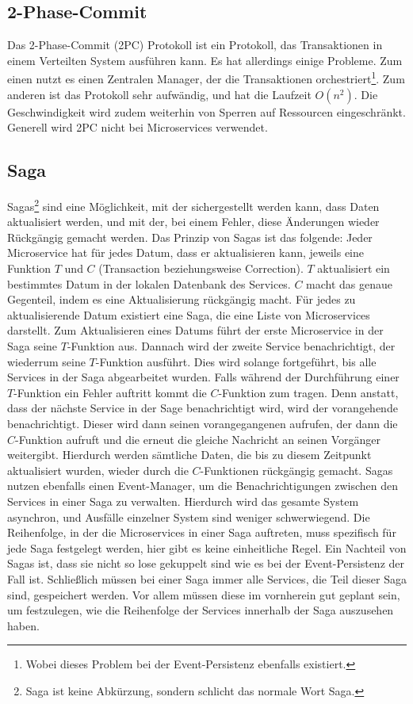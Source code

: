 \subsection{2-Phase-Commit}
Das 2-Phase-Commit (2PC) Protokoll ist ein Protokoll, das Transaktionen in einem Verteilten System ausführen kann. Es hat allerdings einige Probleme. Zum einen nutzt es einen Zentralen Manager, der die Transaktionen orchestriert\footnote{Wobei dieses Problem bei der Event-Persistenz ebenfalls existiert.}. Zum anderen ist das Protokoll sehr aufwändig, und hat die Laufzeit $O(n^2)$. Die Geschwindigkeit wird zudem weiterhin von Sperren auf Ressourcen eingeschränkt. Generell wird 2PC nicht bei Microservices verwendet.

\subsection{Saga}
Sagas\footnote{Saga ist keine Abkürzung, sondern schlicht das normale Wort \glqq Saga\grqq.} sind eine Möglichkeit, mit der sichergestellt werden kann, dass Daten aktualisiert werden, und mit der, bei einem Fehler, diese Änderungen wieder Rückgängig gemacht werden.
Das Prinzip von Sagas ist das folgende:
Jeder Microservice hat für jedes Datum, dass er aktualisieren kann, jeweils eine Funktion $T$ und $C$ (Transaction beziehungsweise Correction). $T$ aktualisiert ein bestimmtes Datum in der lokalen Datenbank des Services. $C$ macht das genaue Gegenteil, indem es eine Aktualisierung rückgängig macht. Für jedes zu aktualisierende Datum existiert eine Saga, die eine Liste von Microservices darstellt. Zum Aktualisieren eines Datums führt der erste Microservice in der Saga seine $T$-Funktion aus. Dannach wird der zweite Service benachrichtigt, der wiederrum seine $T$-Funktion ausführt. Dies wird solange fortgeführt, bis alle Services in der Saga abgearbeitet wurden. Falls während der Durchführung einer $T$-Funktion ein Fehler auftritt kommt die $C$-Funktion zum tragen. Denn anstatt, dass der nächste Service in der Sage benachrichtigt wird, wird der vorangehende benachrichtigt. Dieser wird dann seinen vorangegangenen aufrufen, der dann die $C$-Funktion aufruft und die erneut die gleiche Nachricht an seinen Vorgänger weitergibt. Hierdurch werden sämtliche Daten, die bis zu diesem Zeitpunkt aktualisiert wurden, wieder durch die $C$-Funktionen rückgängig gemacht.
Sagas nutzen ebenfalls einen Event-Manager, um die Benachrichtigungen zwischen den Services in einer Saga zu verwalten. Hierdurch wird das gesamte System asynchron, und Ausfälle einzelner System sind weniger schwerwiegend.
Die Reihenfolge, in der die Microservices in einer Saga auftreten, muss spezifisch für jede Saga festgelegt werden, hier gibt es keine einheitliche Regel.
Ein Nachteil von Sagas ist, dass sie nicht so lose gekuppelt sind wie es bei der Event-Persistenz der Fall ist. Schließlich müssen bei einer Saga immer alle Services, die Teil dieser Saga sind, gespeichert werden. Vor allem müssen diese im vornherein gut geplant sein, um festzulegen, wie die Reihenfolge der Services innerhalb der Saga auszusehen haben.\cite{sagas}
